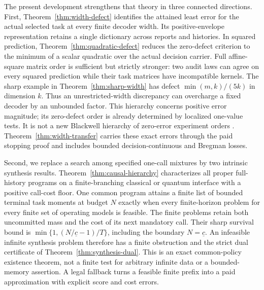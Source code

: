 The present development strengthens that theory in three connected directions. First, Theorem~\ref{thm:width-defect} identifies the attained least error for the actual selected task at every finite decoder width. Its positive-envelope representation retains a single dictionary across reports and histories. In squared prediction, Theorem~\ref{thm:quadratic-defect} reduces the zero-defect criterion to the minimum of a scalar quadratic over the actual decision carrier. Full affine-square matrix order is sufficient but strictly stronger: two audit laws can agree on every squared prediction while their task matrices have incompatible kernels. The sharp example in Theorem~\ref{thm:sharp-width} has defect $\min(m,k)/(5k)$ in dimension $k$. Thus an unrestricted-width discrepancy can overcharge a fixed decoder by an unbounded factor. This hierarchy concerns positive error magnitude; its zero-defect order is already determined by localized one-value tests. It is not a new Blackwell hierarchy of zero-error experiment orders \cite{Blackwell,BR14}. Theorem~\ref{thm:width-transfer} carries these exact errors through the paid stopping proof and includes bounded decision-continuous and Bregman losses.

Second, we replace a search among specified one-call mixtures by two intrinsic synthesis results. Theorem~\ref{thm:causal-hierarchy} characterizes all proper full-history programs on a finite-branching classical or quantum interface with a positive call-cost floor. One common program attains a finite list of bounded terminal task moments at budget $N$ exactly when every finite-horizon problem for every finite set of operating models is feasible. The finite problems retain both uncommitted mass and the cost of its next mandatory call. Their sharp survival bound is $\min\{1,(N/\underline c-1)/T\}$, including the boundary $N=\underline c$. An infeasible infinite synthesis problem therefore has a finite obstruction and the strict dual certificate of Theorem~\ref{thm:synthesis-dual}. This is an exact common-policy existence theorem, not a finite test for arbitrary infinite data or a bounded-memory assertion. A legal fallback turns a feasible finite prefix into a paid approximation with explicit score and cost errors.


